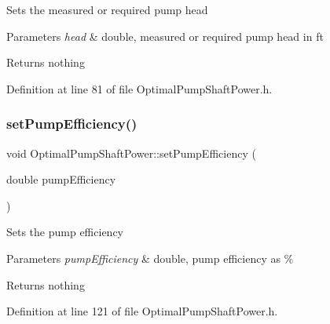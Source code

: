 Sets the measured or required pump head


\begin{DoxyParams}{Parameters}
{\em head} & double, measured or required pump head in ft\\
\hline
\end{DoxyParams}
\begin{DoxyReturn}{Returns}
nothing 
\end{DoxyReturn}


Definition at line 81 of file Optimal\+Pump\+Shaft\+Power.\+h.

\mbox{\label{class_optimal_pump_shaft_power_a2cb2c6b537c7db0bc5071f09c66308d0}} 
\subsubsection{\texorpdfstring{set\+Pump\+Efficiency()}{setPumpEfficiency()}\hspace{0.1cm}{\footnotesize\ttfamily [1/3]}}
{\footnotesize\ttfamily void Optimal\+Pump\+Shaft\+Power\+::set\+Pump\+Efficiency (\begin{DoxyParamCaption}\item[{double}]{pump\+Efficiency }\end{DoxyParamCaption})\hspace{0.3cm}{\ttfamily [inline]}}

Sets the pump efficiency


\begin{DoxyParams}{Parameters}
{\em pump\+Efficiency} & double, pump efficiency as \%\\
\hline
\end{DoxyParams}
\begin{DoxyReturn}{Returns}
nothing 
\end{DoxyReturn}


Definition at line 121 of file Optimal\+Pump\+Shaft\+Power.\+h.

\mbox{\label{class_optimal_pump_shaft_power_a2cb2c6b537c7db0bc5071f09c66308d0}} 
